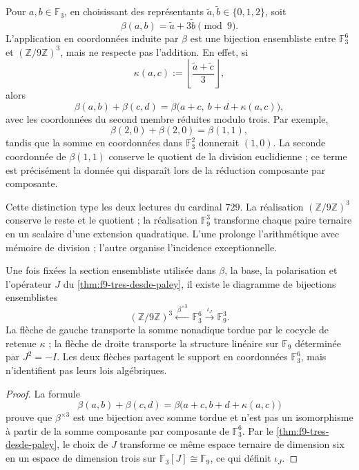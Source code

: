 Pour \(a,b\in\mathbb F_3\), en choisissant des représentants
\(\widetilde a,\widetilde b\in\{0,1,2\}\), soit
\[
 \beta(a,b)=\widetilde a+3\widetilde b\pmod 9.
\]
L'application en coordonnées induite par \(\beta\) est une bijection
ensembliste entre \(\mathbb F_3^6\) et \((\mathbb Z/9\mathbb Z)^3\), mais ne
respecte pas l'addition. En effet, si
\[
 \kappa(a,c)
 :=\left\lfloor
 \frac{\widetilde a+\widetilde c}{3}
 \right\rfloor,
\]
alors
\[
 \beta(a,b)+\beta(c,d)
 =\beta\bigl(a+c,\ b+d+\kappa(a,c)\bigr),
\]
avec les coordonnées du second membre réduites modulo trois. Par exemple,
\[
 \beta(2,0)+\beta(2,0)=\beta(1,1),
\]
tandis que la somme en coordonnées dans \(\mathbb F_3^2\) donnerait \((1,0)\). La
seconde coordonnée de \(\beta(1,1)\) conserve le quotient de la division
euclidienne ; ce terme est précisément la donnée qui disparaît lors de la
réduction composante par composante.

Cette distinction type les deux lectures du cardinal \(729\). La réalisation
\((\mathbb Z/9\mathbb Z)^3\) conserve le reste et le quotient ; la réalisation
\(\mathbb F_9^3\) transforme chaque paire ternaire en un scalaire d'une extension
quadratique. L'une prolonge l'arithmétique avec mémoire de division ; l'autre
organise l'incidence exceptionnelle.

\begin{proposition}
\label{prop:dos-lecturas-tipadas-729}
Une fois fixées la section ensembliste utilisée dans \(\beta\), la base, la
polarisation et l'opérateur \(J\) du
\cref{thm:f9-tres-desde-paley}, il existe le diagramme de bijections ensemblistes
\[
\boxed{
(\mathbb Z/9\mathbb Z)^3
\xleftarrow{\;\beta^{\times3}\;}
\mathbb F_3^6
\xrightarrow{\;\iota_J\;}
\mathbb F_9^3.}
\]
La flèche de gauche transporte la somme nonadique tordue par le cocycle de
retenue \(\kappa\) ; la flèche de droite transporte la structure linéaire sur
\(\mathbb F_9\) déterminée par \(J^2=-I\). Les deux flèches partagent le
support en coordonnées \(\mathbb F_3^6\), mais n'identifient pas leurs lois
algébriques.
\end{proposition}

\begin{proof}
La formule
\[
 \beta(a,b)+\beta(c,d)
 =\beta\bigl(a+c,b+d+\kappa(a,c)\bigr)
\]
prouve que \(\beta^{\times3}\) est une bijection avec somme tordue et n'est pas
un isomorphisme à partir de la somme composante par composante de
\(\mathbb F_3^6\). Par le \cref{thm:f9-tres-desde-paley}, le choix de
\(J\) transforme ce même espace ternaire de dimension six en un espace
de dimension trois sur
\(\mathbb F_3[J]\cong\mathbb F_9\), ce qui définit \(\iota_J\).
\end{proof}

